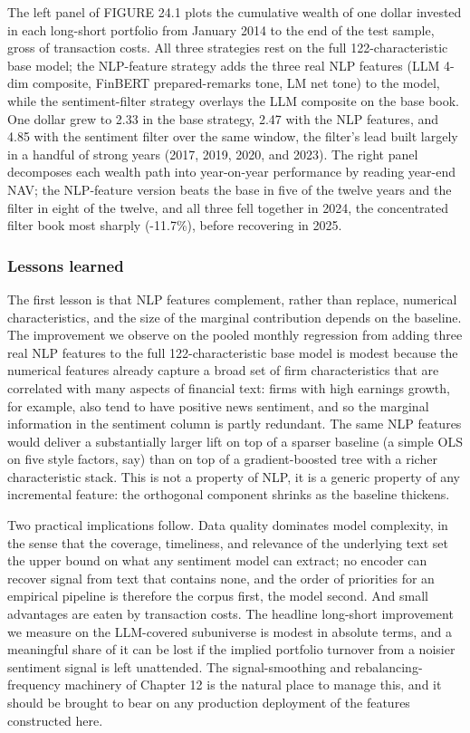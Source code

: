 The left panel of FIGURE 24.1 plots the cumulative wealth of one dollar invested in each long-short portfolio from January 2014 to the end of the test sample, gross of transaction costs. All three strategies rest on the full 122-characteristic base model; the NLP-feature strategy adds the three real NLP features (LLM 4-dim composite, FinBERT prepared-remarks tone, LM net tone) to the model, while the sentiment-filter strategy overlays the LLM composite on the base book. One dollar grew to 2.33 in the base strategy, 2.47 with the NLP features, and 4.85 with the sentiment filter over the same window, the filter's lead built largely in a handful of strong years (2017, 2019, 2020, and 2023). The right panel decomposes each wealth path into year-on-year performance by reading year-end NAV; the NLP-feature version beats the base in five of the twelve years and the filter in eight of the twelve, and all three fell together in 2024, the concentrated filter book most sharply (-11.7\%), before recovering in 2025.

\subsubsection{Lessons learned}

The first lesson is that NLP features complement, rather than replace, numerical characteristics, and the size of the marginal contribution depends on the baseline. The improvement we observe on the pooled monthly regression from adding three real NLP features to the full 122-characteristic base model is modest because the numerical features already capture a broad set of firm characteristics that are correlated with many aspects of financial text: firms with high earnings growth, for example, also tend to have positive news sentiment, and so the marginal information in the sentiment column is partly redundant. The same NLP features would deliver a substantially larger lift on top of a sparser baseline (a simple OLS on five style factors, say) than on top of a gradient-boosted tree with a richer characteristic stack. This is not a property of NLP, it is a generic property of any incremental feature: the orthogonal component shrinks as the baseline thickens.

Two practical implications follow. Data quality dominates model complexity, in the sense that the coverage, timeliness, and relevance of the underlying text set the upper bound on what any sentiment model can extract; no encoder can recover signal from text that contains none, and the order of priorities for an empirical pipeline is therefore the corpus first, the model second. And small advantages are eaten by transaction costs. The headline long-short improvement we measure on the LLM-covered subuniverse is modest in absolute terms, and a meaningful share of it can be lost if the implied portfolio turnover from a noisier sentiment signal is left unattended. The signal-smoothing and rebalancing-frequency machinery of Chapter 12 is the natural place to manage this, and it should be brought to bear on any production deployment of the features constructed here.

